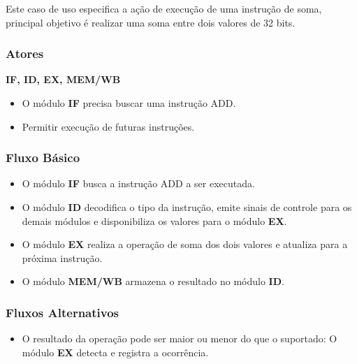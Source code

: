 
Este caso de uso especifica a ação de execução de uma instrução de soma, principal objetivo é realizar uma soma entre dois valores de 32 bits.
 
\subsubsection*{Atores}
\textbf{IF, ID, EX, MEM/WB}

\preconditions 
\begin{itemize}
 \item O módulo \textbf{IF} precisa buscar uma instrução ADD.
\end{itemize}

\postconditions
\begin{itemize}
  \item Permitir execução de futuras instruções.
\end{itemize}

\subsubsection*{Fluxo Básico}
\begin{itemize}
\item O módulo \textbf{IF} busca a instrução ADD a ser executada.
\item O módulo \textbf{ID} decodifica o tipo da instrução, emite sinais de controle para os demais módulos e disponibiliza os valores para o módulo \textbf{EX}.
\item O módulo \textbf{EX} realiza a operação de soma dos dois valores e atualiza para a próxima instrução.
\item O módulo \textbf{MEM/WB} armazena o resultado no módulo \textbf{ID}.
\end{itemize}

\subsubsection*{Fluxos Alternativos}
\begin{itemize}
\item O resultado da operação pode ser maior ou menor do que o suportado:
\subitem O módulo \textbf{EX} detecta e registra a ocorrência.
\end{itemize}

%		

